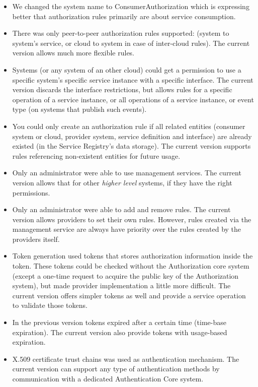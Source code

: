 \documentclass[a4paper]{arrowhead}
\begin{document}
\begin{itemize}
    \item We changed the system name to ConsumerAuthorization which is expressing better that authorization rules primarily are about service consumption. 
    \item There was only peer-to-peer authorization rules supported: (system to system's service, or cloud to system in case of inter-cloud rules). The current version allows much more flexible rules.
    \item Systems (or any system of an other cloud) could get a permission to use a specific system's specific service instance with a specific interface. The current version discards the interface restrictions, but allows rules for a specific operation of a service instance, or all operations of a service instance, or event type (on systems that publish such events). 
    \item You could only create an authorization rule if all related entities (consumer system or cloud, provider system, service definition and interface) are already existed (in the Service Registry's data storage). The current version supports rules referencing non-existent entities for future usage.
    \item Only an administrator were able to use management services. The current version allows that for other \textit{higher level} systems, if they have the right permissions.
    \item Only an administrator were able to add and remove rules. The current version allows providers to set their own rules. However, rules created via the management service are always have priority over the rules created by the providers itself.
    \item Token generation used tokens that stores authorization information inside the token. These tokens could be checked without the Authorization core system (except a one-time request to acquire the public key of the Authorization system), but made provider implementation a little more difficult. The current version offers simpler tokens as well and provide a service operation to validate those tokens.
    \item In the previous version tokens expired after a certain time (time-base expiration). The current version also provide tokens with usage-based expiration.
    \item X.509 certificate trust chains was used as authentication mechanism. The current version can support any type of authentication methods by communication with a dedicated Authentication Core system.
\end{itemize}
\end{document}
